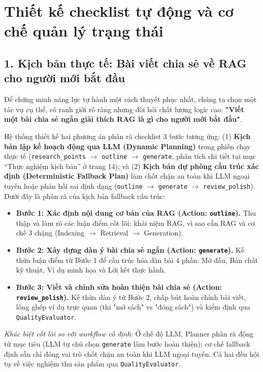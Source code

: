 \documentclass[]{article}
\providecommand{\tightlist}{%
  \setlength{\itemsep}{0pt}\setlength{\parskip}{0pt}}
\begin{document}
\section{Thiết kế checklist tự động và cơ chế quản lý trạng thái}\label{thiet-ke-checklist}

\subsection{1. Kịch bản thực tế: Bài viết chia sẻ về RAG cho người mới bắt đầu}
Để chứng minh năng lực tự hành một cách thuyết phục nhất, chúng ta chọn một tác vụ cụ thể, có ranh giới rõ ràng nhưng đòi hỏi chất lượng logic cao: \textbf{"Viết một bài chia sẻ ngắn giải thích RAG là gì cho người mới bắt đầu"}. 

Hệ thống thiết kế hai phương án phân rã checklist 3 bước tương ứng: (1) \textbf{Kịch bản lập kế hoạch động qua LLM (Dynamic Planning)} trong phiên chạy thực tế (\texttt{research\_points} $\rightarrow$ \texttt{outline} $\rightarrow$ \texttt{generate}, phân tích chi tiết tại mục ``Thực nghiệm kịch bản'' ở trang 14); và (2) \textbf{Kịch bản dự phòng cấu trúc xác định (Deterministic Fallback Plan)} làm chốt chặn an toàn khi LLM ngoại tuyến hoặc phản hồi sai định dạng (\texttt{outline} $\rightarrow$ \texttt{generate} $\rightarrow$ \texttt{review\_polish}). Dưới đây là phân rã của kịch bản fallback cấu trúc:
\begin{itemize}
    \tightlist
    \item \textbf{Bước 1: Xác định nội dung cơ bản của RAG (Action: \texttt{outline}).} Thu thập và làm rõ các luận điểm cốt lõi: khái niệm RAG, vì sao cần RAG và cơ chế 3 chặng (Indexing $\rightarrow$ Retrieval $\rightarrow$ Generation).
    \item \textbf{Bước 2: Xây dựng dàn ý bài chia sẻ ngắn (Action: \texttt{generate}).} Kế thừa luận điểm từ Bước 1 để cấu trúc hóa dàn bài 4 phần: Mở đầu, Bản chất kỹ thuật, Ví dụ minh họa và Lời kết thực hành.
    \item \textbf{Bước 3: Viết và chỉnh sửa hoàn thiện bài chia sẻ (Action: \texttt{review\_polish}).} Kế thừa dàn ý từ Bước 2, chấp bút hoàn chỉnh bài viết, lồng ghép ví dụ trực quan (thi "mở sách" vs "đóng sách") và kiểm định qua \texttt{QualityEvaluator}.
\end{itemize}

\textit{Khác biệt cốt lõi so với workflow cố định:} Ở chế độ LLM, Planner phân rã động từ mục tiêu (LLM tự chủ chọn \texttt{generate} làm bước hoàn thiện); cơ chế fallback định sẵn chỉ đóng vai trò chốt chặn an toàn khi LLM ngoại tuyến. Cả hai đều hội tụ về việc nghiệm thu sản phẩm qua \texttt{QualityEvaluator}.
\end{document}
